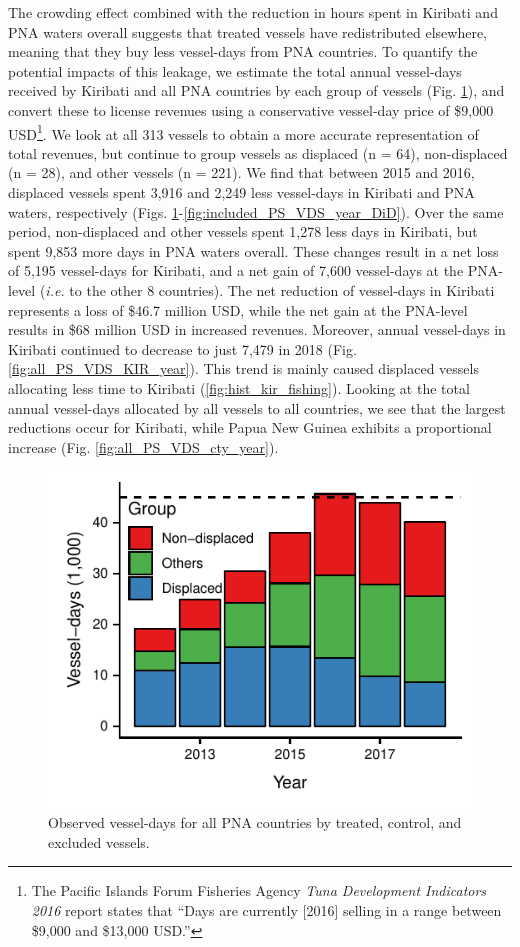 \documentclass[9p,twocolumn,twoside,lineno]{pnas-new}
\begin{document}
The crowding effect combined with the reduction in hours spent in Kiribati and PNA waters overall suggests that treated vessels have redistributed elsewhere, meaning that they buy less vessel-days from PNA countries. To quantify the potential impacts of this leakage, we estimate the total annual vessel-days received by Kiribati and all PNA countries by each group of vessels (Fig. \ref{fig:all_PS_VDS_year}), and convert these to license revenues using a conservative vessel-day price of \$9,000 USD\footnote{The Pacific Islands Forum Fisheries Agency \emph{Tuna Development Indicators 2016} report states that ``Days are currently [2016] selling in a range between \$9,000 and \$13,000 USD.''}. We look at all 313 vessels to obtain a more accurate representation of total revenues, but continue to group vessels as displaced (n = 64), non-displaced (n = 28), and other vessels (n = 221). We find that between 2015 and 2016, displaced vessels spent 3,916 and 2,249 less vessel-days in Kiribati and PNA waters, respectively (Figs. \ref{fig:all_PS_VDS_year}-\ref{fig:included_PS_VDS_year_DiD}). Over the same period, non-displaced and other vessels spent 1,278 less days in Kiribati, but spent 9,853 more days in PNA waters overall. These changes result in a net loss of 5,195 vessel-days for Kiribati, and a net gain of 7,600 vessel-days at the PNA-level (\emph{i.e.} to the other 8 countries). The net reduction of vessel-days in Kiribati represents a loss of \$46.7 million USD, while the net gain at the PNA-level results in \$68 million USD in increased revenues. Moreover, annual vessel-days in Kiribati continued to decrease to just 7,479 in 2018 (Fig. \ref{fig:all_PS_VDS_KIR_year}). This trend is mainly caused displaced vessels allocating less time to Kiribati (\ref{fig:hist_kir_fishing}). Looking at the total annual vessel-days allocated by all vessels to all countries, we see that the largest reductions occur for Kiribati, while Papua New Guinea exhibits a proportional increase (Fig. \ref{fig:all_PS_VDS_cty_year}).

\begin{figure}[ht]
\centering
	\includegraphics{img/all_PS_VDS_year.pdf}
	\caption{\label{fig:all_PS_VDS_year}Observed vessel-days for all PNA countries by treated, control, and excluded vessels.}
\end{figure}
\end{document}
